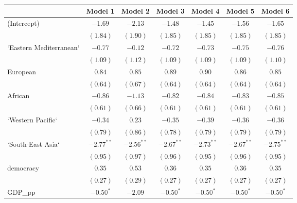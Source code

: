 
\begin{table}[!h]
\begin{center}
\begin{tabular}{l c c c c c c }
\toprule
 & Model 1 & Model 2 & Model 3 & Model 4 & Model 5 & Model 6 \\
\midrule
(Intercept)             & $-1.69$      & $-2.13$      & $-1.48$      & $-1.45$      & $-1.56$      & $-1.65$      \\
                        & $(1.84)$     & $(1.90)$     & $(1.85)$     & $(1.85)$     & $(1.85)$     & $(1.85)$     \\
`Eastern Mediterranean` & $-0.77$      & $-0.12$      & $-0.72$      & $-0.73$      & $-0.75$      & $-0.76$      \\
                        & $(1.09)$     & $(1.12)$     & $(1.09)$     & $(1.09)$     & $(1.09)$     & $(1.10)$     \\
European                & $0.84$       & $0.85$       & $0.89$       & $0.90$       & $0.86$       & $0.85$       \\
                        & $(0.64)$     & $(0.67)$     & $(0.64)$     & $(0.64)$     & $(0.64)$     & $(0.64)$     \\
African                 & $-0.86$      & $-1.13$      & $-0.82$      & $-0.84$      & $-0.83$      & $-0.85$      \\
                        & $(0.61)$     & $(0.66)$     & $(0.61)$     & $(0.61)$     & $(0.61)$     & $(0.61)$     \\
`Western Pacific`       & $-0.34$      & $0.23$       & $-0.35$      & $-0.39$      & $-0.36$      & $-0.36$      \\
                        & $(0.79)$     & $(0.86)$     & $(0.78)$     & $(0.79)$     & $(0.79)$     & $(0.79)$     \\
`South-East Asia`       & $-2.77^{**}$ & $-2.56^{**}$ & $-2.67^{**}$ & $-2.73^{**}$ & $-2.67^{**}$ & $-2.75^{**}$ \\
                        & $(0.95)$     & $(0.97)$     & $(0.96)$     & $(0.95)$     & $(0.96)$     & $(0.95)$     \\
democracy               & $0.35$       & $0.53$       & $0.36$       & $0.35$       & $0.36$       & $0.35$       \\
                        & $(0.27)$     & $(0.29)$     & $(0.27)$     & $(0.27)$     & $(0.27)$     & $(0.27)$     \\
GDP\_pp                 & $-0.50^{*}$  & $-2.09$      & $-0.50^{*}$  & $-0.50^{*}$  & $-0.50^{*}$  & $-0.50^{*}$  \\

\end{tabular}
\end{center}
\end{table}
